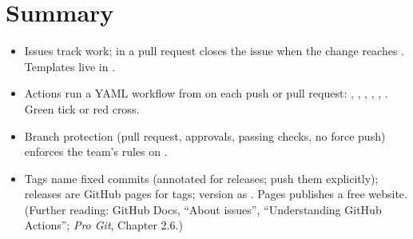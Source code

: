 \section{Summary}

\begin{itemize}
  \item Issues track work;  in a pull request closes the issue when the change reaches . Templates live in .
  \item Actions run a YAML workflow from  on each push or pull request: , , , , , . Green tick or red cross.
  \item Branch protection (pull request, approvals, passing checks, no force push) enforces the team's rules on .
  \item Tags name fixed commits (annotated for releases; push them explicitly); releases are GitHub pages for tags; version as . Pages publishes a free website. (Further reading: GitHub Docs, ``About issues'', ``Understanding GitHub Actions''; \emph{Pro Git}, Chapter 2.6.)
\end{itemize}


\solutionspage




